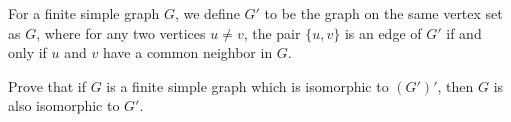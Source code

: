 For a finite simple graph $G$,  we define $G'$ to be the graph on the same vertex set as $G$,  where for any two vertices $u \neq v$,  the pair $\{u,v\}$ is an edge of $G'$ if and only if $u$ and $v$ have a common neighbor in $G$.

Prove that if $G$ is a finite simple graph which is isomorphic to $(G')'$,  then $G$ is also isomorphic to $G'$.
